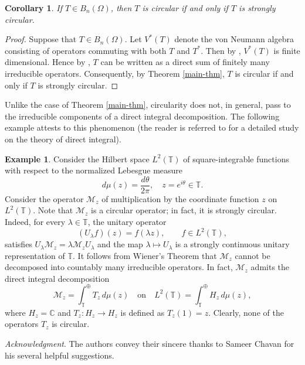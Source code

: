 \documentclass[a4paper,oneside,10pt, reqno]{amsproc}
\newtheorem{corollary}[theorem]{Corollary}%
\theoremstyle{remark}
\theoremstyle{definition}
\newtheorem{example}[theorem]{Example}
\begin{document}
\begin{corollary}
If $T \in B_n(\Omega)$, then $T$ is circular if and only if $T$ is strongly circular.
\end{corollary}

\begin{proof}
Suppose that $T \in B_n(\Omega)$. Let $V^*(T)$ denote the von Neumann algebra consisting of operators commuting with both $T$ and $T^*$. Then by \cite[Corollary 3.7]{CDG}, $V^*(T)$ is finite dimensional. Hence by \cite[Corollary 3.2]{FJW}, $T$ can be written as a direct sum of finitely many irreducible operators. Consequently, by Theorem \ref{main-thm}, $T$ is circular if and only if $T$ is strongly circular.
\end{proof}

Unlike the case of Theorem \ref{main-thm}, circularity does not, in general, pass to the irreducible components of a direct integral decomposition. The following example attests to this phenomenon (the reader is referred to \cite{D} for a detailed study on the theory of direct integral). 
\begin{example}\label{direct-integral}
Consider the Hilbert space $L^2(\mathbb T)$ of square-integrable functions with respect to the normalized Lebesgue measure
\[
d\mu(z)=\frac{d\theta}{2\pi}, \quad z=e^{i\theta}\in\mathbb T.
\]
Consider the operator $\mathscr M_z$ of multiplication by the coordinate function $z$ on $L^2(\mathbb T)$. Note that $\mathscr M_z$ is a circular operator; in fact, it is strongly circular. Indeed, for every $\lambda\in\mathbb T$, the unitary operator
\[
(U_\lambda f)(z)=f(\lambda z), \qquad f\in L^2(\mathbb T),
\]
satisfies $U_\lambda \mathscr M_z = \lambda \mathscr M_{z} U_\lambda$ and the map $\lambda \mapsto U_\lambda$ is a strongly continuous unitary representation of $\mathbb T$. It follows from Wiener's Theorem \cite[Theorem 1.2.1]{N} that $\mathscr M_z$ cannot be decomposed into countably many irreducible operators. In fact, $\mathscr M_z$ admits the direct integral decomposition
\[
\mathscr M_z
=\int_{\mathbb T}^{\oplus} T_z\, d\mu(z)
\quad \text{on} \quad
L^2(\mathbb T)
=
\int_{\mathbb T}^{\oplus} H_z\, d\mu(z),
\]
where $H_z=\mathbb C$ and $T_z:H_z\to H_z$ is defined as $T_z(1)=z
$. Clearly, none of the operators $T_z$ is circular.
\end{example}

\medskip \textit{Acknowledgment}.
The authors convey their sincere thanks to Sameer Chavan for his several helpful suggestions.
\end{document}
